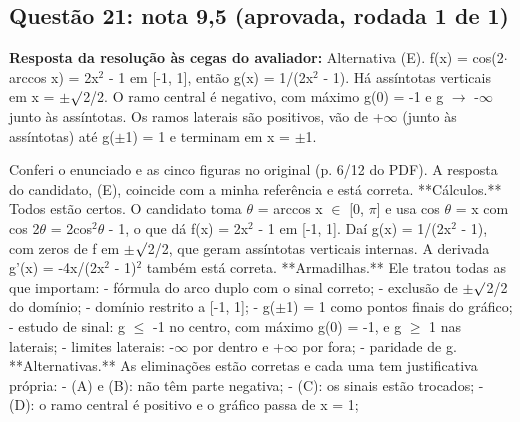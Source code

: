 \documentclass{article}%
\begin{document}
\subsection*{Questão 21: nota 9,5 (aprovada, rodada 1 de 1)}%
\textbf{Resposta da resolução às cegas do avaliador:} Alternativa (E). f(x) = cos(2$\cdot$arccos x) = 2x$^2$ - 1 em {[}-1, 1{]}, então g(x) = 1/(2x$^2$ - 1). Há assíntotas verticais em x = $\pm$$\surd$2/2. O ramo central é negativo, com máximo g(0) = -1 e g $\to$ -$\infty$ junto às assíntotas. Os ramos laterais são positivos, vão de +$\infty$ (junto às assíntotas) até g($\pm$1) = 1 e terminam em x = $\pm$1.\par %
Conferi o enunciado e as cinco figuras no original (p. 6/12 do PDF). A resposta do candidato, (E), coincide com a minha referência e está correta.\newline%
\newline%
**Cálculos.** Todos estão certos. O candidato toma $\theta$ = arccos x $\in$ {[}0, $\pi${]} e usa cos $\theta$ = x com cos 2$\theta$ = 2cos$^2$$\theta$ - 1, o que dá f(x) = 2x$^2$ - 1 em {[}-1, 1{]}. Daí g(x) = 1/(2x$^2$ - 1), com zeros de f em $\pm$$\surd$2/2, que geram assíntotas verticais internas. A derivada g'(x) = -4x/(2x$^2$ - 1)$^2$ também está correta.\newline%
\newline%
**Armadilhas.** Ele tratou todas as que importam:\newline%
{-} fórmula do arco duplo com o sinal correto;\newline%
{-} exclusão de $\pm$$\surd$2/2 do domínio;\newline%
{-} domínio restrito a {[}-1, 1{]};\newline%
{-} g($\pm$1) = 1 como pontos finais do gráfico;\newline%
{-} estudo de sinal: g $\leq$ -1 no centro, com máximo g(0) = -1, e g $\geq$ 1 nas laterais;\newline%
{-} limites laterais: -$\infty$ por dentro e +$\infty$ por fora;\newline%
{-} paridade de g.\newline%
\newline%
**Alternativas.** As eliminações estão corretas e cada uma tem justificativa própria:\newline%
{-} (A) e (B): não têm parte negativa;\newline%
{-} (C): os sinais estão trocados;\newline%
{-} (D): o ramo central é positivo e o gráfico passa de x = 1;\newline%
\end{document}
